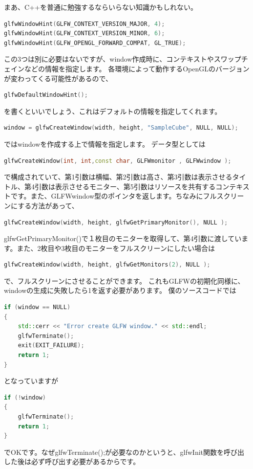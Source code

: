 \documentclass[a4paper,titlepage,dvipdfmx]{jsarticle}
\begin{document}
まあ、C++を普通に勉強するならいらない知識かもしれない。
\begin{lstlisting}[language=C++]
glfwWindowHint(GLFW_CONTEXT_VERSION_MAJOR, 4);
glfwWindowHint(GLFW_CONTEXT_VERSION_MINOR, 6);
glfwWindowHint(GLFW_OPENGL_FORWARD_COMPAT, GL_TRUE);
\end{lstlisting}
この3つは別に必要はないですが、window作成時に、コンテキストやスワップチェインなどの情報を指定します。
各環境によって動作するOpenGLのバージョンが変わってくる可能性があるので、
\begin{lstlisting}[language=C++]
glfwDefaultWindowHint();
\end{lstlisting}
を書くといいでしょう、これはデフォルトの情報を指定してくれます。
\begin{lstlisting}[language=C++]
window = glfwCreateWindow(width, height, "SampleCube", NULL, NULL);
\end{lstlisting}
ではwindowを作成する上で情報を指定します。
データ型としては
\begin{lstlisting}[language=C++]
glfwCreateWindow(int, int,const char, GLFWmonitor , GLFWwindow );
\end{lstlisting}
で構成されていて、第1引数は横幅、第2引数は高さ、第3引数は表示させるタイトル、第4引数は表示させるモニター、第5引数はリソースを共有するコンテキストです。また、GLFWwindow型のポインタを返します。ちなみにフルスクリーンにする方法があって、
\begin{lstlisting}[language=C++]
glfwCreateWindow(width, height, glfwGetPrimaryMonitor(), NULL );
\end{lstlisting}
glfwGetPrimaryMonitor()で１枚目のモニターを取得して、第4引数に渡しています。また、2枚目や3枚目のモニターをフルスクリーンにしたい場合は
\begin{lstlisting}[language=C++]
glfwCreateWindow(width, height, glfwGetMonitors(2), NULL );
\end{lstlisting}
で、フルスクリーンにさせることができます。
これもGLFWの初期化同様に、windowの生成に失敗したら1を返す必要があります。
僕のソースコードでは
\begin{lstlisting}[language=C++]
if (window == NULL)
{
	std::cerr << "Error create GLFW window." << std::endl;
	glfwTerminate();
	exit(EXIT_FAILURE);
	return 1;
}
\end{lstlisting}
となっていますが
\begin{lstlisting}[language=C++]
if (!window)
{
	glfwTerminate();
	return 1;
}
\end{lstlisting}
でOKです。なぜglfwTerminate();が必要なのかというと、glfwInit関数を呼び出した後は必ず呼び出す必要があるからです。
\end{document}
